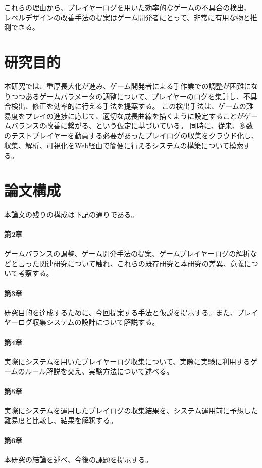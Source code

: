 これらの理由から、プレイヤーログを用いた効率的なゲームの不具合の検出、 レベルデザインの改善手法の提案はゲーム開発者にとって、非常に有用な物と推測できる。


\section{研究目的}
本研究では、重厚長大化が進み、ゲーム開発者による手作業での調整が困難になりつつあるゲームパラメータの調整について、プレイヤーのログを集計し、不具合検出、修正を効率的に行える手法を提案する。
この検出手法は、ゲームの難易度をプレイの進捗に応じて、適切な成長曲線を描くように設定することがゲームバランスの改善に繋がる、という仮定に基づいている。
同時に、従来、多数のテストプレイヤーを動員する必要があったプレイログの収集をクラウド化し、収集、解析、可視化をWeb経由で簡便に行えるシステムの構築について模索する。

\section{論文構成}
本論文の残りの構成は下記の通りである。
\paragraph{第2章}
ゲームバランスの調整、ゲーム開発手法の提案、ゲームプレイヤーログの解析などと言った関連研究について触れ、これらの既存研究と本研究の差異、意義について考察する。
\paragraph{第3章}
研究目的を達成するために、今回提案する手法と仮説を提示する。また、プレイヤーログ収集システムの設計について解説する。
\paragraph{第4章}
実際にシステムを用いたプレイヤーログ収集について、実際に実験に利用するゲームのルール解説を交え、実験方法について述べる。
\paragraph{第5章}
実際にシステムを運用したプレイログの収集結果を、システム運用前に予想した難易度と比較し、結果を解釈する。
\paragraph{第6章}
本研究の結論を述べ、今後の課題を提示する。
